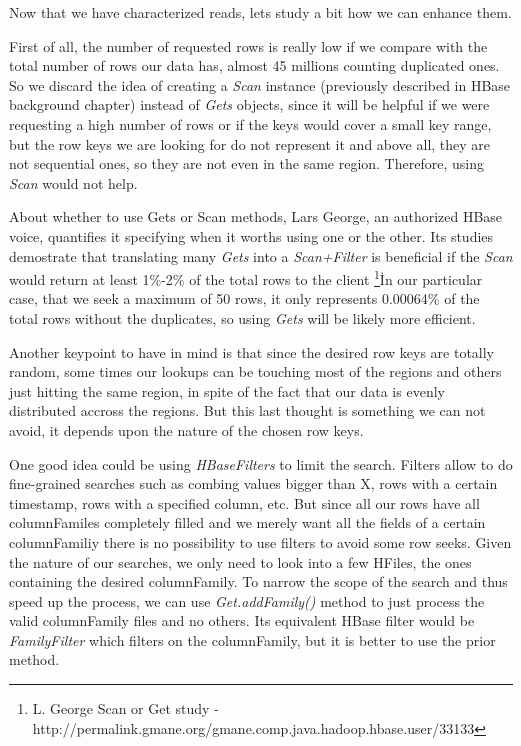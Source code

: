 Now that we have characterized reads, lets study a bit how we can enhance them. 
\par
First of all, the number of requested rows is really low if we compare with the total number of rows our data has, almost 45 millions counting duplicated ones. So we discard the idea of creating a \textit{Scan} instance (previously described in HBase background chapter) instead of \textit{Gets} objects, since it will be helpful if we were requesting a high number of rows or if the keys would cover a small key range, but the row keys we are looking for do not represent it and above all, they are not sequential ones, so they are not even in the same region. Therefore, using \textit{Scan} would not help. 
\par
About whether to use Gets or Scan methods, Lars George, an authorized HBase voice, quantifies it specifying when it worths using one or the other. Its studies demostrate that translating many \textit{Gets} into a \textit{Scan+Filter} is beneficial if the \textit{Scan} would return at least 1\%-2\% of the total rows to the client \footnote{ L. George Scan or Get study - http://permalink.gmane.org/gmane.comp.java.hadoop.hbase.user/33133}\. In our particular case, that we seek a maximum of 50 rows, it only represents 0.00064\% of the total rows without the duplicates, so using \textit{Gets} will be likely more efficient.
\par
Another keypoint to have in mind is that since the desired row keys are totally random, some times our lookups can be touching most of the regions and others just hitting the same region, in spite of the fact that our data is evenly distributed accross the regions. But this last thought is something we can not avoid, it depends upon the nature of the chosen row keys.
\par
One good idea could be using \textit{HBaseFilters} to limit the search. Filters allow to do fine-grained searches such as combing values bigger than X, rows with a certain timestamp, rows with a specified column, etc. But since all our rows have all columnFamiles completely filled and we merely want all the fields of a certain columnFamiliy there is no possibility to use filters to avoid some row seeks. Given the nature of our searches, we only need to look into a few HFiles, the ones containing the desired columnFamily. To narrow the scope of the search and thus speed up the process, we can use \textit{Get.addFamily()} method to just process the valid columnFamily files and no others. Its equivalent HBase filter would be \textit{FamilyFilter} which filters on the columnFamily, but it is better to use the prior method.
\par

